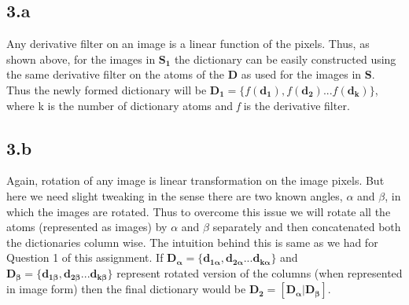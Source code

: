 \documentclass[12pt]{article}
\begin{document}
\subsection*{3.a}
Any derivative filter on an image is a linear function of the pixels. Thus, as shown above, for the images in $\boldsymbol{S_1}$ the dictionary can be easily constructed using the  same derivative filter on the atoms of the $\boldsymbol{D}$ as used for the images in $\boldsymbol{S}$. Thus the newly formed dictionary will be $\boldsymbol{D_1} = \{f(\boldsymbol{d_1}), f(\boldsymbol{d_2})... f(\boldsymbol{d_k})\}$, where k is the number of dictionary atoms and \textit{f} is the derivative filter.
\subsection*{3.b}
Again, rotation of any image is linear transformation on the image pixels. But here we need slight tweaking in the sense there are two known angles, $\alpha$ and $\beta$, in which the images are rotated. Thus to overcome this issue we will rotate all the atoms (represented as images) by $\alpha$ and $\beta$ separately and then concatenated both the dictionaries column wise. The intuition behind this is same as we had for Question 1 of this assignment. If $\boldsymbol{D_{\alpha}} = \{\boldsymbol{d_{1\alpha}}, \boldsymbol{d_{2\alpha}}... \boldsymbol{d_{k\alpha}}\}$ and $\boldsymbol{D_{\beta}} = \{\boldsymbol{d_{1\beta}}, \boldsymbol{d_{2\beta}}... \boldsymbol{d_{k\beta}}\}$ represent rotated version of the columns (when represented in image form) then the final dictionary would be $\boldsymbol{D_{2}} = [\boldsymbol{D_{\alpha}} | \boldsymbol{D_{\beta}}]$.
\end{document}
